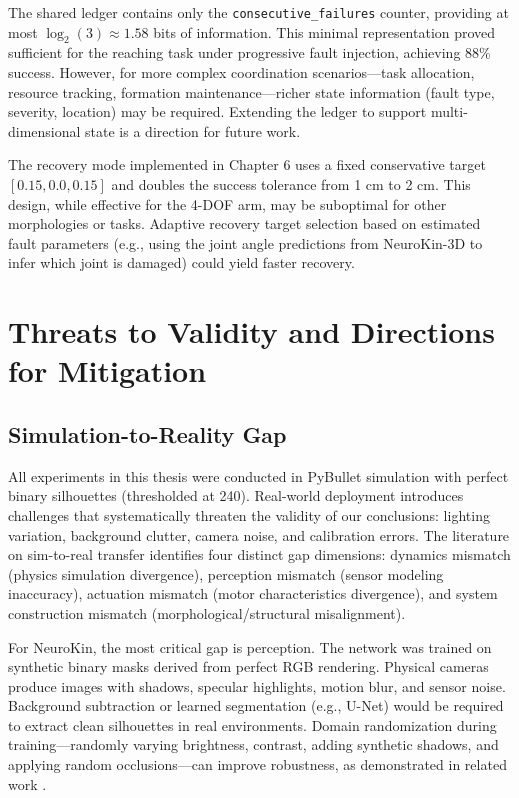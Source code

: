 \documentclass[12pt,a4paper,oneside]{report}
\begin{document}
The shared ledger contains only the \texttt{consecutive\_failures} counter, providing at most $\log_2(3) \approx 1.58$ bits of information. This minimal representation proved sufficient for the reaching task under progressive fault injection, achieving 88\% success. However, for more complex coordination scenarios---task allocation, resource tracking, formation maintenance---richer state information (fault type, severity, location) may be required. Extending the ledger to support multi-dimensional state is a direction for future work.

The recovery mode implemented in Chapter 6 uses a fixed conservative target $[0.15, 0.0, 0.15]$ and doubles the success tolerance from 1 cm to 2 cm. This design, while effective for the 4-DOF arm, may be suboptimal for other morphologies or tasks. Adaptive recovery target selection based on estimated fault parameters (e.g., using the joint angle predictions from NeuroKin-3D to infer which joint is damaged) could yield faster recovery.

\section{Threats to Validity and Directions for Mitigation}

\subsection{Simulation-to-Reality Gap}

All experiments in this thesis were conducted in PyBullet simulation with perfect binary silhouettes (thresholded at 240). Real-world deployment introduces challenges that systematically threaten the validity of our conclusions: lighting variation, background clutter, camera noise, and calibration errors. The literature on sim-to-real transfer \cite{tan2018simtoreal, aljalbout2026realitygap} identifies four distinct gap dimensions: dynamics mismatch (physics simulation divergence), perception mismatch (sensor modeling inaccuracy), actuation mismatch (motor characteristics divergence), and system construction mismatch (morphological/structural misalignment).

For NeuroKin, the most critical gap is perception. The network was trained on synthetic binary masks derived from perfect RGB rendering. Physical cameras produce images with shadows, specular highlights, motion blur, and sensor noise. Background subtraction or learned segmentation (e.g., U-Net) would be required to extract clean silhouettes in real environments. Domain randomization during training---randomly varying brightness, contrast, adding synthetic shadows, and applying random occlusions---can improve robustness, as demonstrated in related work \cite{rezvani2024robust, qiu2024swim2real}.
\end{document}
